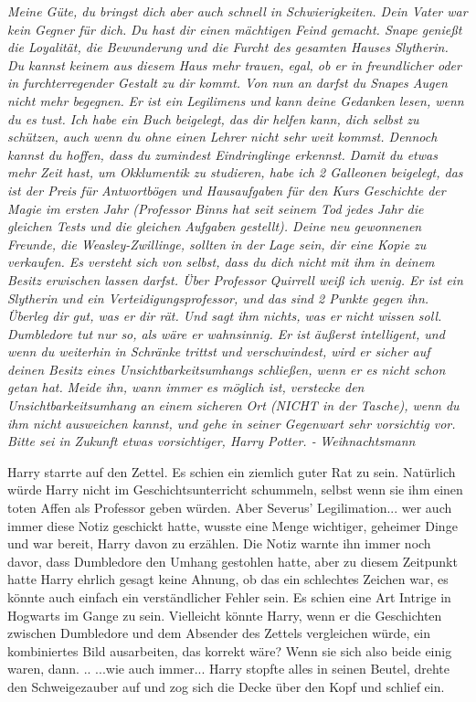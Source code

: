 \emph{Meine Güte, du bringst dich aber auch schnell in Schwierigkeiten. Dein
Vater war kein Gegner für dich. } \emph{Du hast dir einen mächtigen Feind
gemacht. Snape genießt die Loyalität, die Bewunderung und die Furcht des
gesamten Hauses Slytherin. Du kannst keinem aus diesem Haus mehr trauen, egal,
ob er in freundlicher oder in furchterregender Gestalt zu dir kommt. Von nun an
darfst du Snapes Augen nicht mehr begegnen. } \emph{Er ist ein Legilimens und
kann deine Gedanken lesen, wenn du es tust. Ich habe ein Buch beigelegt, das dir
helfen kann, dich selbst zu schützen, auch wenn du ohne einen Lehrer nicht sehr
weit kommst. Dennoch kannst du hoffen, dass du zumindest Eindringlinge erkennst.
Damit du etwas mehr Zeit hast, um Okklumentik zu studieren, habe ich 2 Galleonen
beigelegt, das ist der Preis für Antwortbögen und Hausaufgaben für den Kurs
Geschichte der Magie im ersten Jahr (Professor Binns hat seit seinem Tod jedes
Jahr die gleichen Tests und die gleichen Aufgaben gestellt). Deine neu
gewonnenen Freunde, die Weasley-Zwillinge, sollten in der Lage sein, dir eine
Kopie zu verkaufen. Es versteht sich von selbst, dass du dich nicht mit ihm in
deinem Besitz erwischen lassen darfst. Über Professor Quirrell weiß ich wenig.
Er ist ein Slytherin und ein Verteidigungsprofessor, und das sind 2 Punkte gegen
ihn. Überleg dir gut, was er dir rät. Und sagt ihm nichts, was er nicht wissen
soll. } \emph{Dumbledore tut nur so, als wäre er wahnsinnig. Er ist äußerst
intelligent, und wenn du weiterhin in Schränke trittst und verschwindest, wird
er sicher auf deinen Besitz eines Unsichtbarkeitsumhangs schließen, wenn er es
nicht schon getan hat.} \emph{Meide ihn, wann immer es möglich ist, verstecke
den Unsichtbarkeitsumhang an einem sicheren Ort (NICHT in der Tasche), wenn du
ihm nicht ausweichen kannst, und gehe in seiner Gegenwart sehr vorsichtig vor.
Bitte sei in Zukunft etwas vorsichtiger, Harry Potter. - } \emph{Weihnachtsmann
}

Harry starrte auf den Zettel. Es schien ein ziemlich guter Rat zu sein.
Natürlich würde Harry nicht im Geschichtsunterricht schummeln, selbst wenn sie
ihm einen toten Affen als Professor geben würden. Aber Severus' Legilimation...
wer auch immer diese Notiz geschickt hatte, wusste eine Menge wichtiger,
geheimer Dinge und war bereit, Harry davon zu erzählen. Die Notiz warnte ihn
immer noch davor, dass Dumbledore den Umhang gestohlen hatte, aber zu diesem
Zeitpunkt hatte Harry ehrlich gesagt keine Ahnung, ob das ein schlechtes Zeichen
war, es könnte auch einfach ein verständlicher Fehler sein. Es schien eine Art
Intrige in Hogwarts im Gange zu sein. Vielleicht könnte Harry, wenn er die
Geschichten zwischen Dumbledore und dem Absender des Zettels vergleichen würde,
ein kombiniertes Bild ausarbeiten, das korrekt wäre? Wenn sie sich also beide
einig waren, dann. .. ...wie auch immer... Harry stopfte alles in seinen Beutel,
drehte den Schweigezauber auf und zog sich die Decke über den Kopf und schlief
ein.


